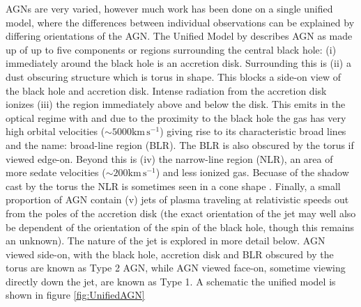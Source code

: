 AGNs are very varied, however much work has been done on a single unified model, where the differences between individual observations can be explained by differing orientations of the AGN. The Unified Model by \citet{Antonucci1993} describes AGN as made up of up to five components or regions surrounding the central black hole: (i) immediately around the black hole is an accretion disk. Surrounding this is (ii) a dust obscuring structure which is torus in shape. This blocks a side-on view of the black hole and accretion disk. Intense radiation from the accretion disk ionizes (iii) the region immediately above and below the disk. This emits in the optical regime with and due to the proximity to the black hole the gas has very high orbital velocities ($\sim 5000 \mathrm{km \, s^{-1}}$) giving rise to its characteristic broad lines and the name: broad-line region (BLR). The BLR is also obscured by the torus if viewed edge-on. Beyond this is (iv) the narrow-line region (NLR), an area of more sedate velocities ($\sim 200 \mathrm{km \, s^{-1}}$) and less ionized gas. Becuase of the shadow cast by the torus the NLR is sometimes seen in a cone shape \citep{Wilson1994}. Finally, a small proportion of AGN contain (v) jets of plasma traveling at relativistic speeds out from the poles of the accretion disk (the exact orientation of the jet may well also be dependent of the orientation of the spin of the black hole, though this remains an unknown). The nature of the jet is explored in more detail below. AGN viewed side-on, with the black hole, accretion disk and BLR obscured by the torus are known as Type 2 AGN, while AGN viewed face-on, sometime viewing directly down the jet, are known as Type 1. A schematic the unified model is shown in figure \ref{fig:UnifiedAGN}

